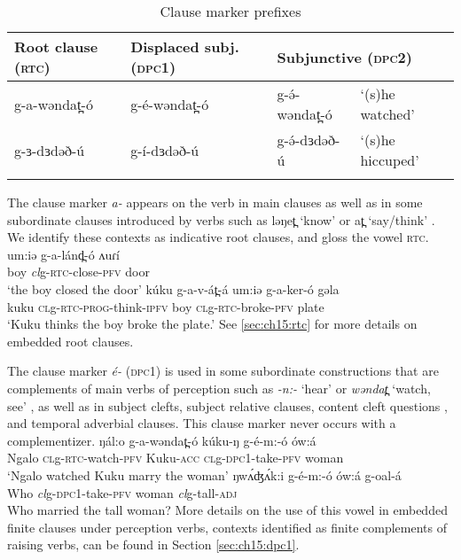 \begin{table}
	\caption{Clause marker prefixes} \label{tab:ch11:clause}
	\begin{tabular}{llll}
	\lsptoprule 
Root clause (\textsc{rtc}) & Displaced subj. (\textsc{dpc1}) & \multicolumn{2}{l}{Subjunctive (\textsc{dpc2}) } \\
\midrule
g-a-wəndat̪-ó  &  g-é-wəndat̪-ó & g-ə́-wəndat̪-ó & `(s)he watched'\\
g-ɜ-dɜdəð-ú	& g-í-dɜdəð-ú &  g-ə́-dɜdəð-ú & `(s)he hiccuped'\\
\lspbottomrule
	\end{tabular}
\end{table}

The clause marker \textit{a-} appears on the verb in main clauses as well as in some subordinate clauses introduced by verbs such as ləŋet̪  ‘know’ or at̪ ‘say/think’  . We identify these contexts as indicative root clauses, and gloss the vowel \textsc{rtc}.
\ea  \label{ex:ch11:rtc}
\ea \gll 	um:iə  g-a-lánd̪-ó             ʌuɾí\\
			boy     \textit{cl}g-\textsc{rtc}-close-\textsc{pfv}		door\\
	\glt		‘the boy closed the door’
\ex \gll	kúku   g-a-v-át̪-á     um:iə    g-a-ker-ó         gəla\\
			kuku    \textsc{cl}g-\textsc{rtc}-\textsc{prog}-think-\textsc{ipfv}  boy       \textsc{cl}g-\textsc{rtc}-broke-\textsc{pfv}   plate\\
	\glt		 `Kuku thinks the boy broke the plate.'
\z 
\z 
See \ref{sec:ch15:rtc} for more details on embedded root clauses.

The clause marker \textit{é-} (\textsc{dpc1}) is used in some subordinate constructions that are complements of main verbs of perception such as \textit{-n:-} ‘hear’ or \textit{wəndat̪ }	‘watch, see’ , as well as in subject clefts, subject relative clauses, content cleft questions , and temporal adverbial clauses. This clause marker never occurs with a complementizer.
\ea
\ea \gll	ŋál:o    g-a-wəndat̪-ó              kúku-ŋ       g-é-m:-ó                       ów:á \\
     Ngalo \textsc{cl}g-\textsc{rtc}-watch-\textsc{pfv} Kuku-\textsc{acc} \textsc{cl}g-\textsc{dpc1}-take-\textsc{pfv} woman \\
\glt 	‘Ngalo watched Kuku marry the woman’  \label{ex:ch11:dpc1a}
\ex \gll 	ŋwʌ́ʤʌ́k:i   g-é-m:-ó                      ów:á      g-oal-á\\
			Who          \textit{cl}g-\textsc{dpc1}-take-\textsc{pfv}   woman  \textit{cl}g-tall-\textsc{adj}\\
	\glt 	Who married the tall woman?	\label{ex:ch11:dpc1b}
\z 
\z
More details on the use of this vowel in embedded finite clauses under perception verbs, contexts identified as finite complements of raising verbs, can be found in Section \ref{sec:ch15:dpc1}.

